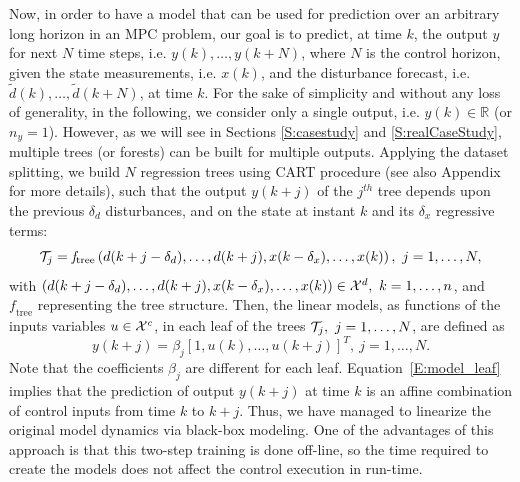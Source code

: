 \textcolor[rgb]{0,0,1}{Now, in order to have a model that can be used for prediction over an arbitrary long horizon in an MPC problem, our goal is to predict, at time $k$, the output $y$ for next $N$ time steps, i.e. $y(k),\ldots,y(k+N)$, where $N$ is the control horizon, given the state measurements, i.e. $x(k)$, and the disturbance forecast, i.e. $\tilde d(k),\ldots,\tilde d(k+N)$, at time $k$.
For the sake of simplicity and without any loss of generality, in the following, we consider only a single output, i.e. $y(k)\in\mathbb{R}$ (or $n_y = 1$).
However, as we will see in Sections \ref{S:casestudy} and \ref{S:realCaseStudy}, multiple trees (or forests) can be built for multiple outputs.
Applying the dataset splitting, we build $N$ regression trees using CART procedure \cite{Breiman1984} (see also Appendix for more details), such that the output $y(k+j)$ of the $j^{th}$ tree depends upon the previous $\delta_d$ disturbances, and on the state at instant $k$ and its $\delta_x$ regressive terms:
\begin{equation}\label{E:model_tree}
\T_j = \mathit{f}_{\mathrm{tree}} \left( d(k+j-\delta_d),\ldots,d(k+j),x(k-\delta_x),\ldots,x(k)  \right),\ j=1,\ldots,N,
\end{equation}
with $\left( d(k+j-\delta_d),\ldots,d(k+j),x(k-\delta_x),\ldots,x(k)  \right)\in\X^d,\ k=1,\ldots,n$, and $\mathit{f}_{\mathrm{tree}}$ representing the tree structure.
Then, the linear models, as functions of the inputs variables $u\in\mathcal{X}^c$, in each leaf of the trees $\T_j,\ j=1,\ldots,N$, are defined as
\begin{equation}\label{E:model_leaf}
y(k+j) =  \beta_j [1,u(k),\ldots,u(k+j) ]^T,\ j=1,\ldots,N.
\end{equation}}
Note that the coefficients $\beta_j$ are different for each leaf.
Equation~\eqref{E:model_leaf} implies that the prediction of output $y(k+j)$ at time $k$ is an affine combination of control inputs from time $k$ to $k+j$.
Thus, we have managed to linearize the original model dynamics via black-box modeling.
\textcolor[rgb]{0,0,1}{One of the advantages of this approach is that this two-step training is done off-line, so the time required to create the models does not affect the control execution in run-time.}

